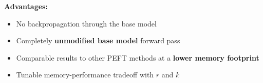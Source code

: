 \textbf{Advantages:}

\begin{itemize}[]
    \item No backpropagation through the base model
    \item Completely \textbf{unmodified base model} forward pass
    \item Comparable results to other PEFT methods at a \textbf{lower memory footprint}
    \item Tunable memory-performance tradeoff with $r$ and $k$
\end{itemize}

